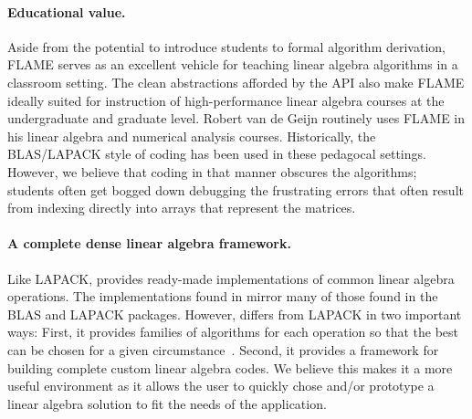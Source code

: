 





\paragraph{Educational value.}
Aside from the potential to introduce students to formal algorithm
derivation, FLAME serves as an excellent vehicle for teaching linear
algebra algorithms in a classroom setting.
The clean abstractions afforded by the API also make FLAME ideally suited
for instruction of high-performance linear algebra courses at the
undergraduate and graduate level.
Robert van de Geijn routinely uses FLAME in his linear algebra and
numerical analysis courses.
Historically, the BLAS/LAPACK style of coding has been used in these
pedagocal settings.  However, we believe that coding in that manner
obscures the algorithms; students often get bogged down debugging the
frustrating errors that often result from indexing directly into
arrays that represent the matrices.

\paragraph{A complete dense linear algebra framework.}
Like LAPACK, \libflame provides ready-made implementations of common
linear algebra operations.  The implementations found in \libflame
mirror many of those found in the BLAS and LAPACK packages.  However,
\libflame differs from LAPACK in two important ways: First, it
provides families of algorithms for each operation so that the best
can be chosen for a given circumstance~\cite{Bientinesi:2008:FAR}.  Second, it
provides a framework for building complete custom linear algebra
codes.  We believe this makes it a more useful environment as it
allows the user to quickly chose and/or prototype a linear algebra
solution to fit the needs of the application.

